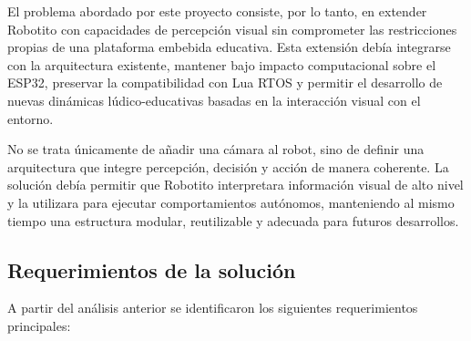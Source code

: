 \documentclass{prgrado}
\begin{document}
El problema abordado por este proyecto consiste, por lo tanto, en extender Robotito con capacidades de percepción visual sin comprometer las restricciones propias de una plataforma embebida educativa. Esta extensión debía integrarse con la arquitectura existente, mantener bajo impacto computacional sobre el ESP32, preservar la compatibilidad con Lua RTOS y permitir el desarrollo de nuevas dinámicas lúdico-educativas basadas en la interacción visual con el entorno.

No se trata únicamente de añadir una cámara al robot, sino de definir una arquitectura que integre percepción, decisión y acción de manera coherente. La solución debía permitir que Robotito interpretara información visual de alto nivel y la utilizara para ejecutar comportamientos autónomos, manteniendo al mismo tiempo una estructura modular, reutilizable y adecuada para futuros desarrollos.

\subsection{Requerimientos de la solución}

A partir del análisis anterior se identificaron los siguientes requerimientos principales:
\end{document}
